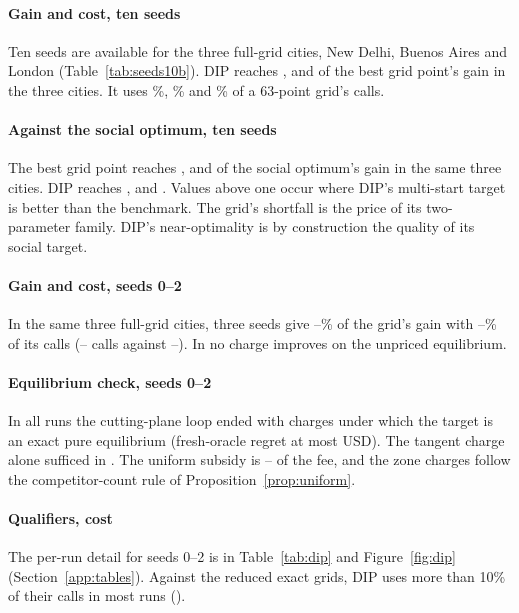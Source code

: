 \documentclass[preprint,11pt]{elsarticle}
\theoremstyle{definition}
\theoremstyle{remark}
\begin{document}
\paragraph{Gain and cost, ten seeds} Ten seeds are available for the three full-grid cities, New Delhi, Buenos Aires and London (Table~\ref{tab:seeds10b}). DIP reaches \TenDipGridNewDelhi, \TenDipGridBuenosAires{} and \TenDipGridLondon{} of the best grid point's gain in the three cities. It uses \TenDipCallsNewDelhi\%, \TenDipCallsBuenosAires\% and \TenDipCallsLondon\% of a 63-point grid's calls.

\paragraph{Against the social optimum, ten seeds} The best grid point reaches \TenSoGridNewDelhi, \TenSoGridBuenosAires{} and \TenSoGridLondon{} of the social optimum's gain in the same three cities. DIP reaches \TenSoDipNewDelhi, \TenSoDipBuenosAires{} and \TenSoDipLondon. Values above one occur where DIP's multi-start target is better than the benchmark. The grid's shortfall is the price of its two-parameter family. DIP's near-optimality is by construction the quality of its social target.

\paragraph{Gain and cost, seeds 0--2} In the same three full-grid cities, three seeds give \DipFullGainMin--\DipFullGainMax\% of the grid's gain with \DipFullCallsMin--\DipFullCallsMax\% of its calls (\DipCallsFullMin--\DipCallsFullMax{} calls against \GridCallsFullMin--\GridCallsFullMax). In \DipNoGainCities{} no charge improves on the unpriced equilibrium.

\paragraph{Equilibrium check, seeds 0--2} In all \DipRuns{} runs the cutting-plane loop ended with charges under which the target is an exact pure equilibrium (fresh-oracle regret at most \DipRegretMax{} USD). The tangent charge alone sufficed in \DipTangentN. The uniform subsidy is \DipSubsMin--\DipSubsMax{} of the fee, and the zone charges follow the competitor-count rule of Proposition~\ref{prop:uniform}.

\paragraph{Qualifiers, cost} The per-run detail for seeds 0--2 is in Table~\ref{tab:dip} and Figure~\ref{fig:dip} (Section~\ref{app:tables}). Against the reduced exact grids, DIP uses more than 10\% of their calls in most runs (\DipRedCalls).
\end{document}
